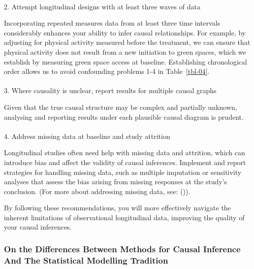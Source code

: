 \documentclass[
  singlecolumn]{article}
\makeatletter
\let\oldparagraph\paragraph
\renewcommand{\paragraph}{
    \@ifstar
      \xxxParagraphStar
      \xxxParagraphNoStar
  }
\newcommand{\xxxParagraphStar}[1]{\oldparagraph*{#1}\mbox{}}
\newcommand{\xxxParagraphNoStar}[1]{\oldparagraph{#1}\mbox{}}
\makeatother
\begin{document}
\paragraph{2. Attempt longitudinal designs with at least three waves of
data}\label{attempt-longitudinal-designs-with-at-least-three-waves-of-data}

Incorporating repeated measures data from at least three time intervals
considerably enhances your ability to infer causal relationships. For
example, by adjusting for physical activity measured before the
treatment, we can ensure that physical activity does not result from a
new initiation to green spaces, which we establish by measuring green
space access at baseline. Establishing chronological order allows us to
avoid confounding problems 1-4 in Table~\ref{tbl-04}.

\paragraph{3. Where causality is unclear, report results for multiple
causal
graphs}\label{where-causality-is-unclear-report-results-for-multiple-causal-graphs}

Given that the true causal structure may be complex and partially
unknown, analysing and reporting results under each plausible causal
diagram is prudent.

\paragraph{4. Address missing data at baseline and study
attrition}\label{address-missing-data-at-baseline-and-study-attrition}

Longitudinal studies often need help with missing data and attrition,
which can introduce bias and affect the validity of causal inferences.
Implement and report strategies for handling missing data, such as
multiple imputation or sensitivity analyses that assess the bias arising
from missing responses at the study's conclusion. (For more about
addressing missing data, see:
()).

By following these recommendations, you will more effectively navigate
the inherent limitations of observational longitudinal data, improving
the quality of your causal inferences.

\subsubsection{On the Differences Between Methods for Causal Inference
And The Statistical Modelling
Tradition}\label{on-the-differences-between-methods-for-causal-inference-and-the-statistical-modelling-tradition}
\end{document}
